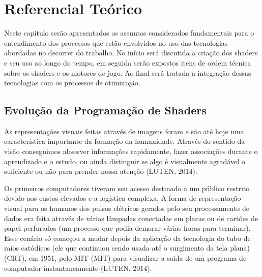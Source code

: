 \chapter{Referencial Teórico}
\label{cap:referencial-teorico}

Neste capítulo serão apresentados os assuntos considerados fundamentais para o entendimento dos processos que estão envolvidos no uso das tecnologias abordadas no decorrer do trabalho. No início será discutida a criação dos shaders e seu uso ao longo do tempo, em seguida serão expostos itens de ordem técnica sobre os shaders e os motores de jogo. Ao final será tratada a integração dessas tecnologias com os processos de otimização.

\section{Evolução da Programação de Shaders}
\label{sec:historia-evolucao-programacao-shaders}

As representações visuais feitas através de imagens foram e são até hoje uma característica importante da formação da humanidade. Através do sentido da visão conseguimos absorver informações rapidamente, fazer associações durante o aprendizado e o estudo, ou ainda distinguir se algo é visualmente agradável o suficiente ou não para prender nossa atenção (LUTEN, 2014)\nocite{openGLBook}.

Os primeiros computadores tiveram seu acesso destinado a um público restrito devido aos custos elevados e a logística complexa. A forma de representação visual para os humanos dos pulsos elétricos gerados pelo seu processamento de dados era feita através de várias lâmpadas conectadas em placas ou de cartões de papel perfurados (um processo que podia demorar várias horas para terminar). Esse cenário só começou a mudar depois da aplicação da tecnologia do tubo de raios catódicos (ele que continuou sendo usada até o surgimento da tela plana) (\acrshort{CRT}), em 1951, pelo MIT (\acrlong{MIT}) para visualizar a saída de um programa de computador instantaneamente (LUTEN, 2014)\nocite{openGLBook}.

\begin{figure}[h!]
	\centering
\end{figure}
\nocite{figura1}


